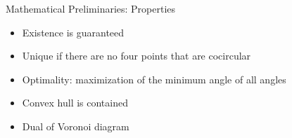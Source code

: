 \documentclass[aspectratio=169,fleqn]{beamer}
\begin{document}
\begin{frame}{Mathematical Preliminaries: Properties}
\begin{minipage}[c]{0.49\textwidth}
    \end{minipage}
    \hfill
    \begin{minipage}[c]{0.49\textwidth}
      \begin{itemize}
        \item<2-> Existence is guaranteed
        \item<3-> Unique if there are no four points that are cocircular
        \item<4-> Optimality: maximization of the minimum angle of all angles
        \item<5-> Convex hull is contained
        \item<6-> Dual of Voronoi diagram
      \end{itemize}
    \end{minipage}
  \end{frame}
\end{document}
